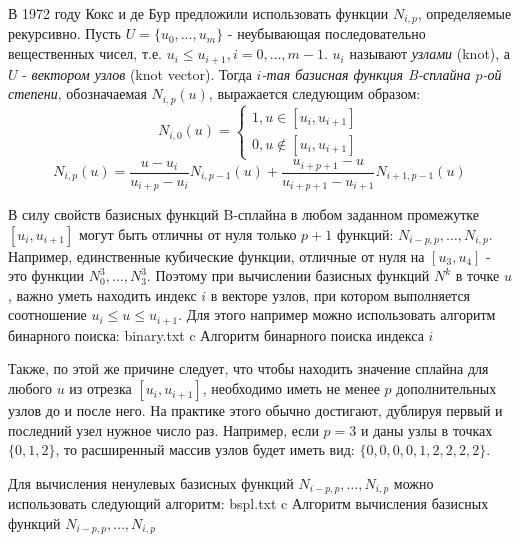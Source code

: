 \documentclass{bmstu}
\begin{document}
В 1972 году Кокс и де Бур предложили использовать функции $N_{i, p}$, определяемые рекурсивно. Пусть $U=\{u_0,\dots,u_m\}$ - неубывающая последовательно  вещественных чисел, т.е. $u_i\le u_{i+1}, i=0,\dots,m-1$. $u_i$ называют \textit{узлами} (knot), а $U$ - \textit{вектором узлов} (knot vector). Тогда \textit{$i$-тая базисная функция B-сплайна $p$-ой степени}, обозначаемая $N_{i,p}(u)$, выражается следующим образом:
\begin{equation}
    N_{i, 0}(u) = \begin{cases}
        1, u\in[u_{i}, u_{i+1}] \\
        0, u\notin[u_{i}, u_{i+1}]
    \end{cases}
\end{equation}
\begin{equation}
    N_{i, p}(u) = \frac{u-u_i}{u_{i+p}-u_i}N_{i, p-1}(u)+\frac{u_{i+p+1}-u}{u_{i+p+1}-u_{i+1}}N_{i+1, p-1}(u)
\end{equation}

В силу свойств базисных функций B-сплайна в любом заданном промежутке $[u_i, u_{i+1}]$ могут быть отличны от нуля только $p+1$ функций: $N_{i-p, p},\dots,N_{i,p}$. Например, единственные кубические функции, отличные от нуля на $[u_3, u_4]$ - это функции $N_0^3,\dots,N_3^3$.
Поэтому при вычислении базисных функций $N^k$ в точке $u$, важно уметь находить индекс $i$ в векторе узлов, при котором выполняется соотношение $u_i\le u \le u_{i+1}$.
Для этого например можно использовать алгоритм бинарного поиска:
{binary.txt} %
{c} %
{Алгоритм бинарного поиска индекса $i$} %

Также, по этой же причине следует, что чтобы находить значение сплайна для любого $u$ из отрезка $[u_{i}, u_{i+1}]$, необходимо иметь не менее $p$ дополнительных узлов до и после него. На практике этого обычно достигают, дублируя первый и последний узел нужное число раз. Например, если $p = 3$ и даны узлы в точках $\{ 0 , 1 , 2 \}$, то расширенный массив узлов будет иметь вид: $\{ 0 , 0 , 0 , 0 , 1 , 2 , 2 , 2 , 2\}$.

Для вычисления ненулевых базисных функций $N_{i-p, p},\dots,N_{i,p}$ можно использовать следующий алгоритм:
{bspl.txt} %
{c} %
{Алгоритм вычисления базисных функций $N_{i-p, p},\dots,N_{i,p}$} %
\end{document}

